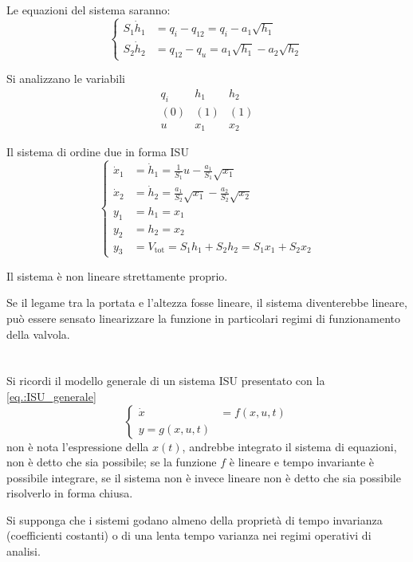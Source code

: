 Le equazioni del sistema saranno:
$$\left\{\begin{aligned}
S_1\dot h_1 &= q_i - q_{12} = q_i - a_1\sqrt{h_1} \\
S_2 \dot h_2 &= q_{12} - q_u = a_1\sqrt{h_1} - a_2\sqrt{h_2}
\end{aligned}\right.$$

Si analizzano le variabili
$$\begin{matrix}
q_i & h_1 & h_2 \\
(0) & (1) & (1) \\
u & x_1 & x_2
\end{matrix}$$

Il sistema di ordine due in forma ISU
$$\left\{\begin{aligned}
\dot x_1 &= \dot h_1 = \frac{1}{S_1} u - \frac{a_1}{S_1} \sqrt{x_1} \\
\dot x_2 &= \dot h_2 = \frac{a_1}{S_2}\sqrt{x_1} - \frac{a_2}{S_2} \sqrt{x_2} \\
y_1 &= h_1 = x_1 \\
y_2 &= h_2 =x_2 \\
y_3 &= V_{\text{tot}} = S_1h_1 + S_2h_2 = S_1x_1 + S_2 x_2
\end{aligned}\right.$$

Il sistema è non lineare strettamente proprio.

Se il legame tra la portata e l'altezza fosse lineare, il sistema diventerebbe
lineare, può essere sensato linearizzare la funzione in particolari regimi di
funzionamento della valvola.


\chapter{}
Si ricordi il modello generale di un sistema ISU presentato con la
\ref{eq.:ISU_generale}
$$
\left\{\begin{aligned}
\dot x & = f(x,u,t) \\
y = g(x,u,t)
\end{aligned}\right.
$$
non è nota l'espressione della $x(t)$, andrebbe
integrato il sistema di equazioni, non è detto che sia possibile; se la
funzione $f$ è lineare e tempo invariante è possibile integrare, se il sistema
non è invece lineare non è detto che sia possibile risolverlo in forma chiusa.

Si supponga che i sistemi godano almeno della proprietà di tempo invarianza
(coefficienti costanti) o di una lenta tempo varianza nei regimi operativi di
analisi.

